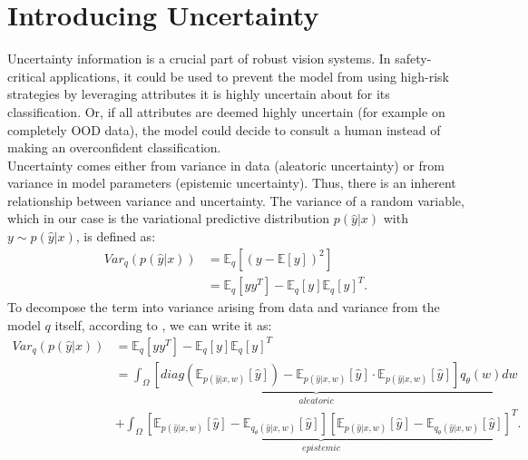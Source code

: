 \documentclass[a4paper,cleardoubleempty,BCOR1cm, 11pt]{report}
\begin{document}
\section{Introducing Uncertainty}
Uncertainty information is a crucial part of robust vision systems. In safety-critical applications, it could be used to prevent the model from using high-risk strategies by leveraging attributes it is highly uncertain about for its classification. Or, if all attributes are deemed highly uncertain (for example on completely OOD data), the model could decide to consult a human instead of making an overconfident classification.\\
Uncertainty comes either from variance in data (aleatoric uncertainty) or from variance in model parameters (epistemic uncertainty). Thus, there is an inherent relationship between variance and uncertainty.
The variance of a random variable, which in our case is the variational predictive distribution $p(\hat{y} | x)$ with $y\sim p(\hat{y} | x)$, is defined as:
\begin{align*}
	Var_q(p(\hat{y} | x)) &= \mathbb{E}_q \left[ (y-\mathbb{E}\left[ y\right])^2 \right]\\
	&= \mathbb{E}_q \left[yy^T\right]  - \mathbb{E}_q\left[y\right]\mathbb{E}_q\left[y\right]^T.
\end{align*}
To decompose the term into variance arising from data and variance from the model $q$ itself, according to \citet{kwon2020uncertainty}, we can write it as:
\begin{align*}
Var_q(p(\hat{y} | x)) &= \mathbb{E}_q \left[yy^T\right]  - \mathbb{E}_q\left[y\right]\mathbb{E}_q\left[y\right]^T\\
	&\underbrace{=\int_{\Omega}\left[ diag (\mathbb{E}_{p(\hat{y}|x,w)}[\hat{y}]) -\mathbb{E}_{p(\hat{y}|x,w)}[\hat{y}] \cdot \mathbb{E}_{p(\hat{y}|x,w)}[\hat{y}] \right]q_{\theta}(w)dw}_{aleatoric}\\
	&+\underbrace{\int_{\Omega}\left[ \mathbb{E}_{p(\hat{y}|x,w)}[\hat{y}] - \mathbb{E}_{q_{\theta}(\hat{y}|x,w)}[\hat{y}] \right] \left[ \mathbb{E}_{p(\hat{y}|x,w)}[\hat{y}] - \mathbb{E}_{q_{\theta}(\hat{y}|x,w)}[\hat{y}] \right]^T}_{epistemic}.
\end{align*}
\end{document}
